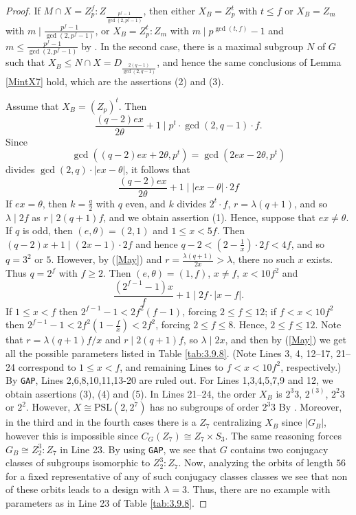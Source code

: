 \documentclass[a4paper,twopage,reqno,12pt]{amsart}
\theoremstyle{definition}
\numberwithin{equation}{section}
\newcommand{\PSL}{\mathrm{PSL}}
\renewcommand{\leq}{\leqslant}
\renewcommand{\geq}{\geqslant}
\begin{document}
\begin{proof} If $M\cap X=Z_{p}^{f}:Z_{\frac{p^{f}-1}{\gcd(2,p^{f}-1)}}$, then either $X_{B}=Z_{p}^{t}$ with $t\leq f$ or 
$X_{B}=Z_{m}$ with $m \mid \frac{p^{f}-1}{\gcd(2,p^{f}-1)}$, or $X_{B}=Z_{p}^{t}:Z_{m}$ with $m \mid p^{\gcd(t,f)}-1$ and $m \leq \frac{p^{f}-1}{\gcd(2,p^{f}-1)}$ by \cite[Proposition III.17.3]{Pass}. In the second case, there is a maximal subgroup $N$ of $G$ such that $X_{B}\leq N\cap X=D_{\frac{2(q-1)}{\gcd(2,q-1)}}$, and hence the same conclusions of Lemma \ref{MintX7} hold, which are the assertions (2) and (3).

Assume that $X_{B}=(Z_{p})^{t}$. Then 
\begin{equation}\label{May}
\frac{\left( q-2\right) ex}{2\theta }+1\mid p^{t}\cdot \gcd(2,q-1)\cdot f\text{.}
\end{equation}
Since 
$$\gcd
\left( \left( q-2\right) ex+2\theta ,p^{t}\right) =\gcd \left( 2ex-2\theta
,p^{t}\right)$$
divides $\gcd(2,q)\cdot \left\vert ex-\theta \right\vert$,
it follows that 
\[
\frac{\left( q-2\right) ex}{2\theta }+1\mid |ex-\theta |\cdot 2f
\]
If  $ex=\theta$, then $k=\frac{q}{2}$ with $q$ even, and $k$ divides $2^{t}\cdot f$, 
$r=\lambda (q+1)$, and so $\lambda\mid 2f$ as $r\mid 2(q+1)f$,
and we obtain assertion (1). Hence, suppose that $ex\neq \theta$. If $q$ is odd, then $(e,\theta )=(2,1)$ and $1\le x<5f$. Then $\left( q-2\right) x+1\mid (2x-1)\cdot
2f$ and hence $q-2<(2-\frac{1}{x})\cdot 2f<4f$, and so $q=3^2$ or $5$.
However, by (\ref{May}) and $r=\frac{\lambda(q+1)}{2x}>\lambda$, there no such $x$ exists.
Thus $q=2^{f}$ with $f \geq 2$. Then $(e,\theta )=(1,f)$, $x \neq f$, 
$x<10f^2$ and 
\[
\frac{\left( 2^{f-1}-1\right) x}{f}+1\mid  2f \cdot \left\vert x-f\right\vert. 
\]%
If $1\leq x <f$ then $2^{f-1}-1< 2f^{2}(f-1)$, forcing $2\leq f\leq 12$;
if $f<x<10f^2$ then $2^{f-1}-1<2f^{2}(1-\frac{f}{x})<2f^{2}$, forcing $2\leq f\leq 8$.
Hence, $2\leq f\leq 12$.
Note that $r=\lambda(q+1)f/x$ and $r\mid 2(q+1)f$, so $\lambda\mid 2x$,
and then by (\ref{May}) we get all the possible parameters listed in Table \ref{tab:3.9.8}.
(Note Lines 3, 4, 12--17, 21--24 correspond to $1\leq x <f$, and remaining Lines to $f<x<10f^2$, respectively.) 
By \texttt{GAP}, Lines 2,6,8,10,11,13-20 are ruled out. For Lines 1,3,4,5,7,9 and 12, we obtain assertions (3), (4) and (5).
In Lines 21--24, the order $X_{B}$ is $2^{3}3$, $2^(3)$, $2^{2}3$ or $2^{2}$. However, $X\cong \PSL(2,2^{7})$ has no subgroups of order $2^{3}3$ By \cite{Di}. Moreover, in the third and in the fourth cases there is a $Z_{7}$ centralizing $X_{B}$ since $\left\vert G_{B}\right\vert$, however this is impossible since $C_G(Z_{7})\cong Z_{7} \times S_{3}$. The same reasoning forces $G_{B} \cong Z_{2}^{3}:Z_{7}$ in Line 23. By using \texttt{GAP}, we see that $G$ contains two conjugacy classes of subgroups isomorphic to $Z_{2}^{3}:Z_{7}$. Now, analyzing the orbits of length $56$ for a fixed representative of any of such conjugacy classes classes we see that non of these orbits leads to a design with $\lambda=3$. Thus, there are no example with parameters as in Line 23 of Table \ref{tab:3.9.8}.  

\end{proof}
\end{document}
